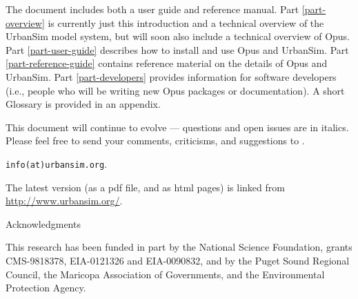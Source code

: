 The document includes both a user guide and reference manual.  Part
\ref{part-overview} is currently just this introduction and a
technical overview of the UrbanSim model system, but will soon also
include a technical overview of Opus. Part \ref{part-user-guide}
describes how to install and use Opus and UrbanSim.  Part
\ref{part-reference-guide} contains reference material on the
details of Opus and UrbanSim. Part \ref{part-developers} provides
information for software developers (i.e., people who will be
writing new Opus packages or documentation).  A short Glossary is
provided in an appendix.

This document will continue to evolve --- questions and open issues are in
italics.  Please feel free to send your comments, 
criticisms, and
suggestions to
. 
\begin{htmlonly}
{\tt info(at)urbansim.org}. 
\end{htmlonly}

The latest version (as a pdf file, and as html pages) is linked from
\url{http://www.urbansim.org/}.

\newpage
{\huge Acknowledgments}

This research has been funded in part by the National Science Foundation, 
grants CMS-9818378, EIA-0121326 and EIA-0090832, and by the Puget
Sound Regional Council, the Maricopa Association of Governments, and the 
Environmental Protection Agency.  

